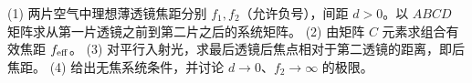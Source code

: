 (1) 两片空气中理想薄透镜焦距分别 \(f_1,f_2\)（允许负号），间距 \(d>0\)。以 \(ABCD\) 矩阵求从第一片透镜之前到第二片之后的系统矩阵。
(2) 由矩阵 \(C\) 元素求组合有效焦距 \(f_{\rm eff}\)。
(3) 对平行入射光，求最后透镜后焦点相对于第二透镜的距离，即后焦距。
(4) 给出无焦系统条件，并讨论 \(d\to0\)、\(f_2\to\infty\) 的极限。
